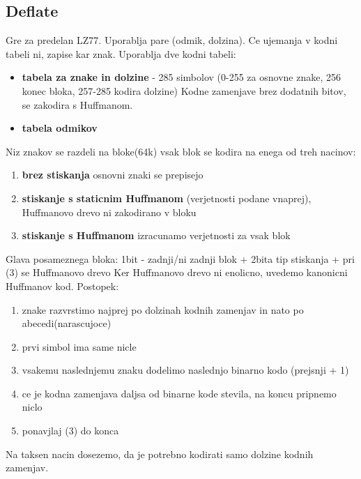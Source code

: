 \documentclass{article}
\begin{document}
\begin{multicols}{4}
\subsection{Deflate}
Gre za predelan LZ77. Uporablja pare (odmik, dolzina). Ce ujemanja v kodni tabeli ni, zapise kar znak.
Uporablja dve kodni tabeli:
\begin{itemize}
    \item \textbf{tabela za znake in dolzine} - 285 simbolov
        (0-255 za osnovne znake, 256 konec bloka, 257-285 kodira dolzine)
        Kodne zamenjave brez dodatnih bitov, se zakodira s Huffmanom.
    \item \textbf{tabela odmikov}
\end{itemize}
Niz znakov se razdeli na bloke(64k)
vsak blok se kodira na enega od treh nacinov:
\begin{enumerate}
    \item \textbf{brez stiskanja} osnovni znaki se prepisejo
    \item \textbf{stiskanje s staticnim Huffmanom} (verjetnosti podane vnaprej), Huffmanovo drevo ni zakodirano v bloku
    \item \textbf{stiskanje s Huffmanom} izracunamo verjetnosti za vsak blok
\end{enumerate}
Glava posameznega bloka: 1bit - zadnji/ni zadnji blok + 2bita tip stiskanja + pri (3) se Huffmanovo drevo
Ker Huffmanovo drevo ni enolicno, uvedemo kanonicni Huffmanov kod. Postopek:
\begin{enumerate}
    \item znake razvrstimo najprej po dolzinah kodnih zamenjav in nato po abecedi(narascujoce)
    \item prvi simbol ima same nicle
    \item vsakemu naslednjemu znaku dodelimo naslednjo binarno kodo (prejsnji + 1)
    \item ce je kodna zamenjava daljsa od binarne kode stevila, na koncu pripnemo niclo
    \item ponavjlaj (3) do konca
\end{enumerate}
Na taksen nacin dosezemo, da je potrebno kodirati samo dolzine kodnih zamenjav.


\end{multicols}
\end{document}
